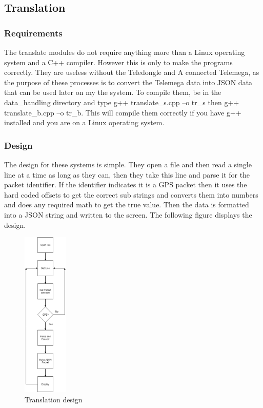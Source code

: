 \documentclass[onecolumn, draftclsnofoot,10pt, compsoc]{IEEEtran}
\begin{document}
\subsection{Translation}
\subsubsection{Requirements}
The translate modules do not require anything more than a Linux operating system and a C++ compiler. However this is only to make the programs correctly. They are useless without the Teledongle and A connected Telemega, as the purpose of these processes is to convert the Telemega data into JSON data that can be used later on my the system. To compile them, be in the data\_handling directory and type g++ translate\_s.cpp –o tr\_s then g++ translate\_b.cpp –o tr\_b. This will compile them correctly if you have g++ installed and you are on a Linux operating system.
\subsubsection{Design}
The design for these systems is simple. They open a file and then read a single line at a time as long as they can, then they take this line and parse it for the packet identifier. If the identifier indicates it is a GPS packet then it uses the hard coded offsets to get the correct sub strings and converts them into numbers and does any required math to get the true value. Then the data is formatted into a JSON string and written to the screen. The following figure displays the design.
\begin{figure}[h]
    \centering
        \includegraphics[height=8cm]{Translate}
        \caption{Translation design}
        \label{fig:Translate}
\end{figure}
\end{document}
